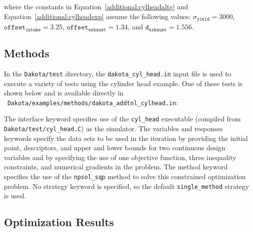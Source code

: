 where the constants in Equation~\ref{additional:cylheadaltg} and
Equation~\ref{additional:cylheadexp} assume the following values:
$\sigma_{\mathtt{yield}}=3000$, $\mathtt{offset_{intake}}=3.25$,
$\mathtt{offset_{exhaust}}=1.34$, and $\mathtt{d_{exhaust}}=1.556$.

\subsection{Methods}\label{additional:cylinder:methods}

In the \texttt{Dakota/test} directory, the
\texttt{dakota\_cyl\_head.in} input file is used to execute a variety
of tests using the cylinder head example. One of these tests is shown
below and is available directly in \\ {\tt
Dakota/examples/methods/dakota\_addtnl\_cylhead.in}:
\begin{center}
  \begin{small}
    \begin{bigbox}
    \end{bigbox}
  \end{small}
\end{center}

The interface keyword specifies use of the \texttt{cyl\_head}
executable (compiled from \texttt{Dakota/test/cyl\_head.C}) as the
simulator. The variables and responses keywords specify the data sets
to be used in the iteration by providing the initial point,
descriptors, and upper and lower bounds for two continuous design
variables and by specifying the use of one objective function, three
inequality constraints, and numerical gradients in the problem. The
method keyword specifies the use of the \texttt{npsol\_sqp} method to
solve this constrained optimization problem. No strategy keyword is
specified, so the default \texttt{single\_method} strategy is used.

\subsection{Optimization Results}\label{additional:cylinder:results}

